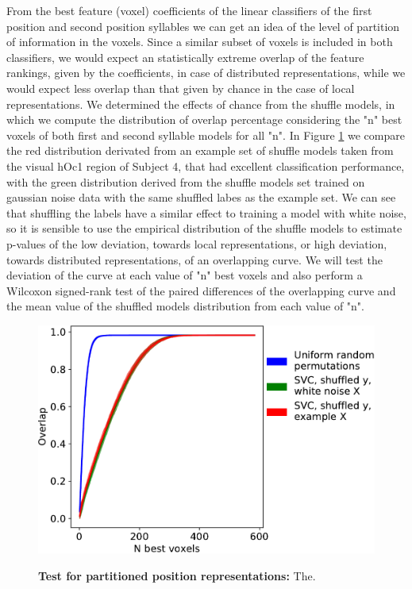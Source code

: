 From the best feature (voxel) coefficients of the linear classifiers of the first position and second position syllables we can get an idea of the level of partition of information in the voxels.
Since a similar subset of voxels is included in both classifiers, we would expect an statistically extreme overlap of the feature rankings, given by the coefficients, in case of distributed representations, while we would expect less overlap than that given by chance in the case of local representations.
We determined the effects of chance from the shuffle models, in which we compute the distribution of overlap percentage considering the "n" best voxels of both first and second syllable models for all "n".
In Figure \ref{fig:segregation_test} we compare the red distribution derivated from an example set of shuffle models taken from the visual hOc1 region of Subject 4, that had excellent classification performance, with the green distribution derived from the shuffle models set trained on gaussian noise data with the same shuffled labes as the example set.
We can see that shuffling the labels have a similar effect to training a model with white noise, so it is sensible to use the empirical distribution of the shuffle models to estimate p-values of the low deviation, towards local representations, or high deviation, towards distributed representations, of an overlapping curve.
We will test the deviation of the curve at each value of "n" best voxels and also perform a Wilcoxon signed-rank test of the paired differences of the overlapping curve and the mean value of the shuffled models distribution from each value of "n".


\begin{figure}[ht]
\scriptsize
\hspace{-4ex}
{\includegraphics[width=1.0\linewidth]{figures/part_II/theoretical_example_legend2.pdf}}
\caption{\textbf{Test for partitioned position representations:}
The.}
\label{fig:segregation_test}
\end{figure}
